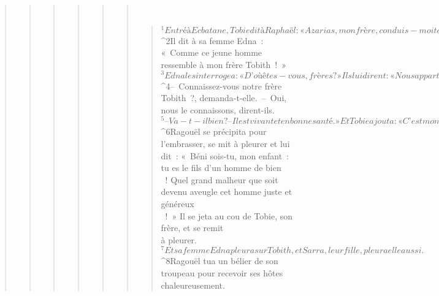 \begin{verse}
\begin{verse}
\begin{verse}
\begin{verse}
\begin{verse}
\begin{verse}
         
      \bchapter{}
      \begin{verse}
${}^{1}Entré à Ecbatane, Tobie dit à Raphaël : « Azarias, mon frère, conduis-moi tout droit chez notre frère Ragouël. » Raphaël le conduisit donc chez Ragouël. Ils le trouvèrent assis à l’entrée de la cour et le saluèrent les premiers. Il leur répondit : « Grande joie à vous, frères, soyez les bienvenus ! », et il les fit entrer dans sa maison. 
${}^{2}Il dit à sa femme Edna : « Comme ce jeune homme ressemble à mon frère Tobith ! » 
${}^{3}Edna les interrogea : « D’où êtes-vous, frères ? » Ils lui dirent : « Nous appartenons à la tribu des fils de Nephtali déportés à Ninive. 
${}^{4}– Connaissez-vous notre frère Tobith ?, demanda-t-elle. – Oui, nous le connaissons, dirent-ils. 
${}^{5}– Va-t-il bien ? – Il est vivant et en bonne santé. » Et Tobie ajouta : « C’est mon père. » 
${}^{6}Ragouël se précipita pour l’embrasser, se mit à pleurer et lui dit : « Béni sois-tu, mon enfant : tu es le fils d’un homme de bien\\ ! Quel grand malheur que soit devenu aveugle cet homme juste et généreux\\ ! » Il se jeta au cou de Tobie, son frère, et se remit\\à pleurer. 
${}^{7}Et sa femme Edna pleura sur Tobith, et Sarra, leur fille, pleura elle aussi. 
${}^{8}Ragouël tua un bélier de son troupeau pour recevoir ses hôtes chaleureusement.
      

\end{verse}
\end{verse}
\end{verse}
\end{verse}
\end{verse}
\end{verse}
\end{verse}
